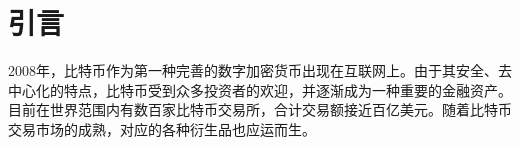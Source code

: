 \chapter{引言}
2008年，比特币作为第一种完善的数字加密货币出现在互联网上\cite{10.2307/1831029}。由于其安全、去中心化的特点，比特币受到众多投资者的欢迎，并逐渐成为一种重要的金融资产。目前在世界范围内有数百家比特币交易所，合计交易额接近百亿美元。随着比特币交易市场的成熟，对应的各种衍生品也应运而生。